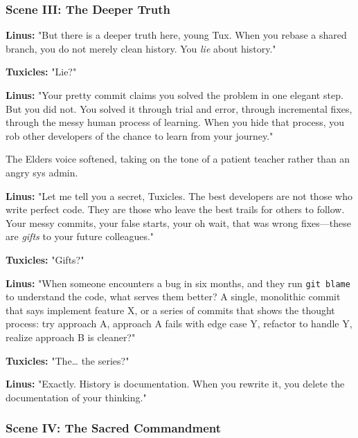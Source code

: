 \bookdivider

\subsubsection{Scene III: The Deeper Truth}\label{scene-iii-the-deeper-truth}

\textbf{Linus:} "But there is a deeper truth here, young Tux. When you rebase a shared branch, you do not merely clean history. You \emph{lie} about history."

\textbf{Tuxicles:} "Lie?"

\textbf{Linus:} "Your pretty commit claims you solved the problem in one elegant step. But you did not. You solved it through trial and error, through incremental fixes, through the messy human process of learning. When you hide that process, you rob other developers of the chance to learn from your journey."

The Elder\textquotesingle s voice softened, taking on the tone of a patient teacher rather than an angry sys admin.

\textbf{Linus:} "Let me tell you a secret, Tuxicles. The best developers are not those who write perfect code. They are those who leave the best trails for others to follow. Your messy commits, your false starts, your \textquotesingle oh wait, that was wrong\textquotesingle{} fixes---these are \emph{gifts} to your future colleagues."

\textbf{Tuxicles:} "Gifts?"

\textbf{Linus:} "When someone encounters a bug in six months, and they run \texttt{git\ blame} to understand the code, what serves them better? A single, monolithic commit that says \textquotesingle implement feature X,\textquotesingle{} or a series of commits that shows the thought process: \textquotesingle try approach A,\textquotesingle{} \textquotesingle approach A fails with edge case Y,\textquotesingle{} \textquotesingle refactor to handle Y,\textquotesingle{} \textquotesingle realize approach B is cleaner\textquotesingle?"

\textbf{Tuxicles:} "The\ldots{} the series?"

\textbf{Linus:} "Exactly. History is documentation. When you rewrite it, you delete the documentation of your thinking."

\bookdivider

\subsubsection{Scene IV: The Sacred Commandment}\label{scene-iv-the-sacred-commandment}

